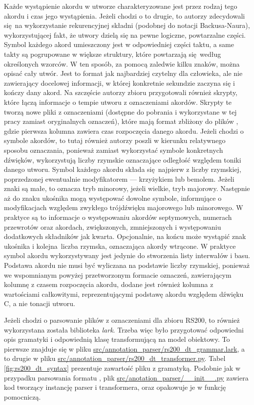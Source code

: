 Każde wystąpienie akordu w utworze charakteryzowane jest przez rodzaj tego akordu i czas jego wystąpienia. Jeżeli chodzi o to drugie, to autorzy zdecydowali się na wykorzystanie rekurencyjnej składni (podobnej do notacji Backusa-Naura), wykorzystującej fakt, że utwory dzielą się na pewne logiczne, powtarzalne części. Symbol każdego akord umieszczony jest w odpowiedniej części taktu, a same takty są pogrupowane w większe struktury, które powtarzają się według określonych wzorców. W ten sposób, za pomocą zaledwie kilku znaków, można opisać cały utwór. Jest to format jak najbardziej czytelny dla człowieka, ale nie zawierający docelowej informacji, w której konkretnie sekundzie zaczyna się i kończy dany akord. Na szczęście autorzy zbioru przygotowali również skrypty, które łączą informacje o tempie utworu z oznaczeniami akordów. Skrypty te tworzą nowe pliki z oznaczeniami (dostępne do pobrania i wykorzystane w tej pracy zamiast oryginalnych oznaczeń), które mają format zbliżony do plików , gdzie pierwsza kolumna zawiera czas rozpoczęcia danego akordu. Jeżeli chodzi o symbole akordów, to tutaj również autorzy poszli w kierunku relatywnego sposobu oznaczania, ponieważ zamiast wykorzystać symbole konkretnych dźwięków, wykorzystują liczby rzymskie oznaczające odległość względem toniki danego utworu.  Symbol każdego akordu składa się najpierw z liczby rzymskiej, poprzedzonej ewentualnie modyfikatorem --- krzyżykiem lub bemolem. Jeżeli znaki są małe, to oznacza tryb minorowy, jeżeli wielkie, tryb majorowy. Następnie aż do znaku ukośnika mogą występować dowolne symbole, informujące o modyfikacjach względem zwykłego trójdźwięku majorowego lub minorowego. W praktyce są to informacje o występowaniu akordów septymowych, numerach przewrotów oraz akordach, zwiększonych, zmniejszonych i występowaniu dodatkowych składników jak kwarta. Opcjonalnie, na końcu może wystąpić znak ukośnika i kolejna liczba rzymska, oznaczająca akordy wtrącone. W praktyce symbol akordu wykorzystywany jest jedynie do stworzenia listy interwałów i basu.  Podstawa akordu nie musi być wyliczana na podstawie liczby rzymskiej, ponieważ we wspomnianym powyżej przetworzonym formacie oznaczeń, zawierającym kolumnę z czasem rozpoczęcia akordu, dodane jest również kolumna z wartościami całkowitymi, reprezentującymi podstawę akordu względem dźwięku C, a nie tonacji utworu.

Jeżeli chodzi o parsowanie plików z oznaczeniami dla zbioru RS200, to również wykorzystana została biblioteka \emph{lark}. Trzeba więc było przygotować odpowiedni opis gramatyki i odpowiednią klasę transformującą na model obiektowy. To pierwsze znajduje się w pliku \url{src/annotation_parser/rs200_dt_grammar.lark}, a to drugie w pliku \url{src/annotation_parser/rs200_dt_transformer.py}. Tabel \ref{fig:rs200_dt_syntax} prezentuje zawartość pliku z gramatyką. Podobnie jak w przypadku parsowania formatu , plik \url{src/anotation_parser/__init__.py} zawiera kod tworzący instancję parser i transformera, oraz opakowuje je w funkcję pomocniczą.

